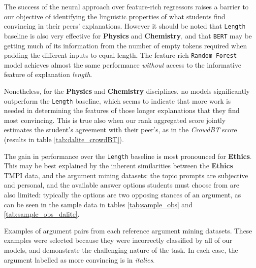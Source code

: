 \documentclass[notitlepage,12pt]{jedm}
\begin{document}
The success of the neural approach over feature-rich regressors raises a 
barrier to our objective of identifying the linguistic properties of what 
students find convincing in their peers' explanations.
However it should be noted that \verb|Length| baseline is also very effective 
for \textbf{Physics} and \textbf{Chemistry}, and that \verb|BERT| may be 
getting much of its information from the number of empty tokens required when 
padding the different inputs to equal length.
The feature-rich \verb|Random Forest| model achieves almost the same 
performance \textit{without} access to the informative feature of explanation 
\textit{length}.

Nonetheless, for the \textbf{Physics} and \textbf{Chemistry} disciplines, no 
models significantly outperform the \verb|Length| baseline, which seems to 
indicate that more work is needed in determining the features of those longer 
explanations that they find most convincing.
This is true also when our rank aggregated score jointly estimates the 
student's agreement with their peer's, as in the \textit{CrowdBT} score 
(results in table \ref{tab:dalite_crowdBT}).

The gain in performance over the \verb|Length| baseline is most pronounced for 
\textbf{Ethics}.
This may be best explained by the inherent similarities between the 
\textbf{Ethics} TMPI data, and the argument mining datasets: the topic prompts 
are subjective and personal, and the available answer options students must 
choose from are also limited: typically the options are two opposing stances of 
an argument, as can be seen in the sample data in tables \ref{tab:sample_obs} 
and \ref{tab:sample_obs_dalite}. 

\begin{table}
	\caption{
		Examples of argument pairs from each reference argument mining 
		datasets. 
		These examples were selected because they were incorrectly classified 
		by all of our models, and demonstrate the challenging nature of the 
		task. 
		In each case, the argument labelled as more convincing is in 
		\textit{italics}.
	}
	\label{tab:sample_obs}
	\begin{subtable}[t]{\textwidth}
		
	\end{subtable}
	\begin{subtable}[t]{\textwidth}
		
	\end{subtable}
\end{table}
\end{document}
